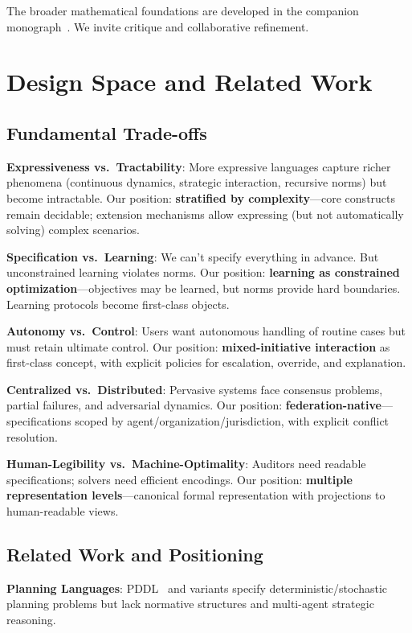 \documentclass[conference]{IEEEtran}
\begin{document}
The broader mathematical foundations are developed in the companion monograph~\cite{bond2026ge}. We invite critique and collaborative refinement.

\section{Design Space and Related Work}
\label{sec:design-space}

\subsection{Fundamental Trade-offs}

\textbf{Expressiveness vs.\ Tractability}: More expressive languages
capture richer phenomena (continuous dynamics, strategic interaction,
recursive norms) but become intractable. Our position:
\textbf{stratified by complexity}---core constructs remain decidable;
extension mechanisms allow expressing (but not automatically solving)
complex scenarios.

\textbf{Specification vs.\ Learning}: We can't specify everything in
advance. But unconstrained learning violates norms. Our position:
\textbf{learning as constrained optimization}---objectives may be
learned, but norms provide hard boundaries. Learning protocols become
first-class objects.

\textbf{Autonomy vs.\ Control}: Users want autonomous handling of routine
cases but must retain ultimate control. Our position:
\textbf{mixed-initiative interaction} as first-class concept, with
explicit policies for escalation, override, and explanation.

\textbf{Centralized vs.\ Distributed}: Pervasive systems face consensus
problems, partial failures, and adversarial dynamics. Our position:
\textbf{federation-native}---specifications scoped by
agent/organization/jurisdiction, with explicit conflict resolution.

\textbf{Human-Legibility vs.\ Machine-Optimality}: Auditors need readable
specifications; solvers need efficient encodings. Our position:
\textbf{multiple representation levels}---canonical formal
representation with projections to human-readable views.

\subsection{Related Work and Positioning}

\textbf{Planning Languages}: PDDL~\cite{ghallab2004} and variants specify
deterministic/stochastic planning problems but lack normative structures
and multi-agent strategic reasoning.
\end{document}
